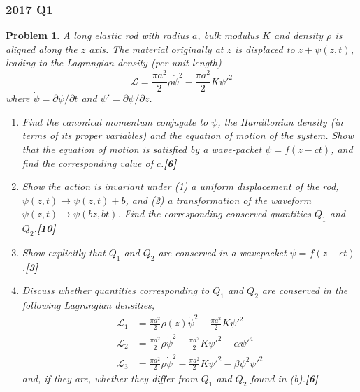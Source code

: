 \documentclass[a4paper]{article}
\theoremstyle{new}
\newtheorem{qns}{Problem}[section]
\begin{document}
\subsubsection*{2017 Q1}
\begin{qns}
A long elastic rod with radius $a$, bulk modulus $K$ and density $\rho$ is aligned along the $z$ axis. The material originally at $z$ is displaced to $z + \psi(z, t)$, leading to the Lagrangian density (per unit length)
$$\mathcal{L}=\frac{\pi a^2}{2}\rho\dot{\psi}^2-\frac{\pi a^2}{2}K\psi'^2$$
where $\dot{\psi}=\partial\psi/\partial t$ and $\psi'=\partial\psi/\partial z$.
\begin{enumerate}[label=(\alph*)]
\item Find the canonical momentum conjugate to $\psi$, the Hamiltonian density (in terms of its proper variables) and the equation of motion of the system. Show that the equation of motion is satisfied by a wave-packet $\psi=f(z-ct)$, and find the corresponding value of $c$.\hfill\textbf{[6]}
\item Show the action is invariant under (1) a uniform displacement of the rod, $\psi(z, t)\rightarrow \psi(z, t) + b$, and (2) a transformation of the waveform $\psi(z, t)\rightarrow \psi(bz, bt)$. Find the corresponding conserved quantities $Q_1$ and $Q_2$.\hfill\textbf{[10]}
\item Show explicitly that $Q_1$ and $Q_2$ are conserved in a wavepacket $\psi=f(z-ct)$.\hfill\textbf{[3]}
\item Discuss whether quantities corresponding to $Q_1$ and $Q_2$ are conserved in the following Lagrangian densities,
\begin{align}
    \mathcal{L}_1&=\frac{\pi a^2}{2}\rho(z)\dot{\psi}^2-\frac{\pi a^2}{2}K\psi'^2\nonumber\\\mathcal{L}_2&=\frac{\pi a^2}{2}\rho\dot{\psi}^2-\frac{\pi a^2}{2}K\psi'^2-\alpha\psi'^4\nonumber\\\mathcal{L}_3&=\frac{\pi a^2}{2}\rho\dot{\psi}^2-\frac{\pi a^2}{2}K\psi'^2-\beta\psi^2\psi'^2\nonumber
\end{align}
and, if they are, whether they differ from $Q_1$ and $Q_2$ found in (b).\hfill\textbf{[6]}
\end{enumerate} 
\end{qns}
\end{document}
